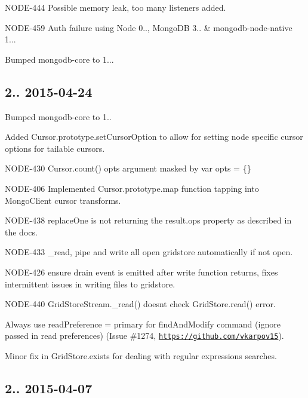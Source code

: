 \begin{DoxyItemize}
\item N\+O\+D\+E-\/444 Possible memory leak, too many listeners added.
\item N\+O\+D\+E-\/459 Auth failure using Node 0.., Mongo\+DB 3.. \& mongodb-\/node-\/native 1...
\item Bumped mongodb-\/core to 1...
\end{DoxyItemize}

\subsection*{2.. 2015-\/04-\/24 }


\begin{DoxyItemize}
\item Bumped mongodb-\/core to 1..
\item Added Cursor.\+prototype.\+set\+Cursor\+Option to allow for setting node specific cursor options for tailable cursors.
\item N\+O\+D\+E-\/430 Cursor.\+count() opts argument masked by var opts = \{\}
\item N\+O\+D\+E-\/406 Implemented Cursor.\+prototype.\+map function tapping into Mongo\+Client cursor transforms.
\item N\+O\+D\+E-\/438 replace\+One is not returning the result.\+ops property as described in the docs.
\item N\+O\+D\+E-\/433 \+\_\+read, pipe and write all open gridstore automatically if not open.
\item N\+O\+D\+E-\/426 ensure drain event is emitted after write function returns, fixes intermittent issues in writing files to gridstore.
\item N\+O\+D\+E-\/440 Grid\+Store\+Stream.\+\_\+read() doesn\textquotesingle{}t check Grid\+Store.\+read() error.
\item Always use read\+Preference = primary for find\+And\+Modify command (ignore passed in read preferences) (Issue \#1274, \href{https://github.com/vkarpov15}{\tt https\+://github.\+com/vkarpov15}).
\item Minor fix in Grid\+Store.\+exists for dealing with regular expressions searches.
\end{DoxyItemize}

\subsection*{2.. 2015-\/04-\/07 }


